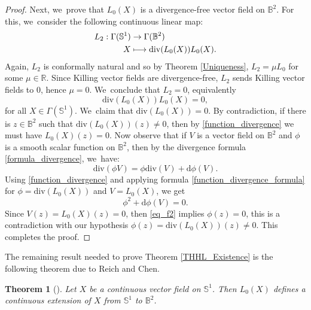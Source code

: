 \documentclass[10pt]{amsart}
\newcommand\mto{\mathchoice{\longmapsto}{\mapsto}{\mapsto}{\mapsto}}
\theoremstyle{plain}
\newtheorem{theorem}[cor]{Theorem}
\theoremstyle{definition}
\begin{document}
\begin{proof}
Next, we~prove that $L_0(X)$ is a divergence-free vector field on $\mathbb{B}^2$. For this, we~consider the following continuous linear map:
\[
\begin{aligned}
L_2:\Gamma(\mathbb{S}^1) & \to \Gamma(\mathbb{B}^2) \\
X & \mto \mathrm{div}(L_0(X))L_0(X).
\end{aligned}
\]
Again, $L_2$ is conformally natural and so by Theorem \ref{Uniqueness}, $L_2=\mu L_0$ for some $\mu\in\mathbb{R}$. Since Killing vector fields are divergence-free, $L_2$ sends Killing vector fields to $0$, hence $\mu=0$. We~conclude that $L_2=0$, equivalently \begin{equation}\label{function_divergence}
\mathrm{div}(L_0(X))L_0(X)=0,
\end{equation} for all $X\in\Gamma(\mathbb{S}^1)$. We~claim that $\mathrm{div}(L_0(X))=0$. By contradiction, if there is $z\in\mathbb{B}^2$ such that $\mathrm{div}(L_0(X))(z)\neq0$, then by \eqref{function_divergence} we must have $L_0(X)(z)=0$. Now observe that if $V$ is a vector field on $\mathbb{B}^2$ and $\phi$ is a smooth scalar function on $\mathbb{B}^2$, then by the divergence formula \eqref{formula_divergence}, we~have:
\begin{equation}\label{function_divergence_formula}
\mathrm{div}(\phi V)=\phi\mathrm{div}(V)+\mathrm{d}\phi(V).
\end{equation}
Using \eqref{function_divergence} and applying formula \eqref{function_divergence_formula} for $\phi=\mathrm{div}(L_0(X))$ and $V=L_0(X)$, we get
\begin{equation}\label{eq_f2}
\phi^2+\mathrm{d}\phi(V)=0.
\end{equation} Since $V(z)=L_0(X)(z)=0$, then \eqref{eq_f2} implies $\phi(z)=0$, this is a contradiction with our hypothesis $\phi(z)=\mathrm{div}(L_0(X))(z)\neq 0$. This completes the proof.
\end{proof}
The remaining result needed to prove Theorem \ref{THHL_Existence} is the following theorem due to Reich and Chen.
\begin{theorem}[\cite{Extension_with_bounded_derivative}]\label{extension_Reich}
Let $X$ be a continuous vector field on $\mathbb{S}^1$. Then $L_0(X)$ defines a continuous extension of $X$ from $\mathbb{S}^1$ to $\mathbb{B}^2$.
\end{theorem}
\end{document}

